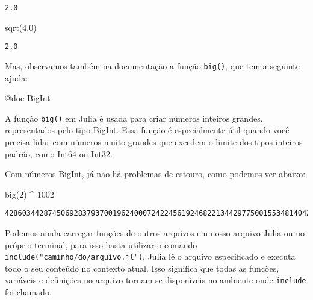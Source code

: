 \documentclass[
  letterpaper,
  DIV=11,
  numbers=noendperiod]{scrreprt}
\newenvironment{Shaded}{\begin{snugshade}}{\end{snugshade}}
\newcommand{\DataTypeTok}[1]{\textcolor[rgb]{0.68,0.00,0.00}{#1}}
\newcommand{\FloatTok}[1]{\textcolor[rgb]{0.68,0.00,0.00}{#1}}
\newcommand{\FunctionTok}[1]{\textcolor[rgb]{0.28,0.35,0.67}{#1}}
\newcommand{\NormalTok}[1]{\textcolor[rgb]{0.00,0.23,0.31}{#1}}
\newcommand{\OperatorTok}[1]{\textcolor[rgb]{0.37,0.37,0.37}{#1}}
\newcommand{\PreprocessorTok}[1]{\textcolor[rgb]{0.68,0.00,0.00}{#1}}
\begin{document}
\begin{verbatim}
2.0
\end{verbatim}

\begin{Shaded}
\begin{Highlighting}[]
\FunctionTok{sqrt}\NormalTok{(}\FloatTok{4.0}\NormalTok{)}
\end{Highlighting}
\end{Shaded}

\begin{verbatim}
2.0
\end{verbatim}

Mas, observamos também na documentação a função \texttt{big()}, que tem
a seguinte ajuda:

\begin{Shaded}
\begin{Highlighting}[]
\PreprocessorTok{@doc} \DataTypeTok{BigInt}
\end{Highlighting}
\end{Shaded}

A função \texttt{big()} em Julia é usada para criar números inteiros
grandes, representados pelo tipo BigInt. Essa função é especialmente
útil quando você precisa lidar com números muito grandes que excedem o
limite dos tipos inteiros padrão, como Int64 ou Int32.

Com números BigInt, já não há problemas de estouro, como podemos ver
abaixo:

\begin{Shaded}
\begin{Highlighting}[]
\FunctionTok{big}\NormalTok{(}\FloatTok{2}\NormalTok{) }\OperatorTok{\^{}} \FloatTok{1002}
\end{Highlighting}
\end{Shaded}

\begin{verbatim}
42860344287450692837937001962400072422456192468221344297750015534814042044997444899727935152627834325103786916702125873007485811427692561743938310298794299215738271099296923941684298420249484567511816728612185899934327765069595070236662175784308251658284785910746168670641719326610497547348822672277504
\end{verbatim}

Podemos ainda carregar funções de outros arquivos em nosso arquivo Julia
ou no próprio terminal, para isso basta utilizar o comando
\texttt{include("caminho/do/arquivo.jl")}, Julia lê o arquivo
especificado e executa todo o seu conteúdo no contexto atual. Isso
significa que todas as funções, variáveis e definições no arquivo
tornam-se disponíveis no ambiente onde \texttt{include} foi chamado.
\end{document}
